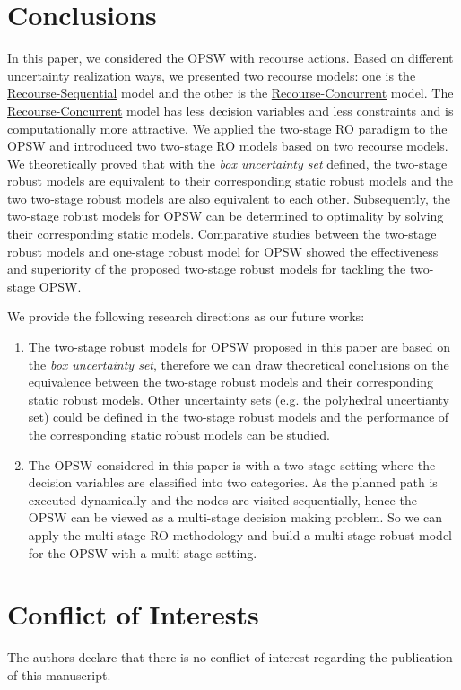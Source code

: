 \documentclass[preprint,review,10pt,round,authoryear]{elsarticle}\usepackage[]{graphicx}\usepackage[]{color}
\theoremstyle{plain}
\theoremstyle{definition}
\theoremstyle{remark}
\begin{document}
\section{Conclusions}
\label{section:conclusion}
In this paper, we considered the OPSW with recourse actions. Based on different uncertainty realization ways, we presented two recourse models: one is the \hyperref[eq:rs]{Recourse-Sequential} model and the other is the \hyperref[eq:rc]{Recourse-Concurrent} model. The \hyperref[eq:rc]{Recourse-Concurrent} model has less decision variables and less constraints and is computationally more attractive. We applied the two-stage RO paradigm to the OPSW and introduced two two-stage RO models based on two recourse models. We theoretically proved that with the \emph{box uncertainty set} defined, the two-stage robust models are equivalent to their corresponding static robust models and the two two-stage robust models are also equivalent to each other. Subsequently, the two-stage robust models for OPSW can be determined to optimality by solving their corresponding static models. Comparative studies between the two-stage robust models and one-stage robust model for OPSW showed the effectiveness and superiority of the proposed two-stage robust models for tackling the two-stage OPSW.

We provide the following research directions as our future works:
\begin{enumerate}
\item The two-stage robust models for OPSW proposed in this paper are based on the \emph{box uncertainty set}, therefore we can draw theoretical conclusions on the equivalence between the two-stage robust models and their corresponding static robust models. Other uncertainty sets (e.g. the polyhedral uncertianty set) could be defined in the two-stage robust models and the performance of the corresponding static robust models can be studied.
\item The OPSW considered in this paper is with a two-stage setting where the decision variables are classified into two categories. As the planned path is executed dynamically and the nodes are visited sequentially, hence the OPSW can be viewed as a multi-stage decision making problem. So we can apply the multi-stage RO methodology and build a multi-stage robust model for the OPSW with a multi-stage setting.
\end{enumerate}

\section*{Conflict of Interests}
The authors declare that there is no conflict of interest regarding the publication of this manuscript.
\end{document}
